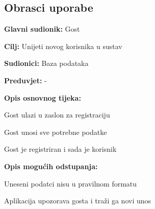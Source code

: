 			\eject 
			
			
				
			\subsection{Obrasci uporabe}
					

					\noindent {}
					\begin{packed_item}
	
						\item \textbf{Glavni sudionik: }Gost
						\item  \textbf{Cilj: }Unijeti novog korisnika u sustav
						\item  \textbf{Sudionici: }Baza podataka
						\item  \textbf{Preduvjet: }-
						\item  \textbf{Opis osnovnog tijeka: }
						
						\item[] \begin{packed_enum}
							\item Gost ulazi u zaslon za registraciju
							\item Gost unosi sve potrebne podatke
							\item Gost je registriran i sada je korisnik
						\end{packed_enum}
						
						\item  \textbf{Opis mogućih odstupanja:}
						
						\item[] \begin{packed_item}
	
							\item[2.a] Uneseni podatci nisu u pravilnom formatu
							\item[] \begin{packed_enum}
								\item Aplikacija upozorava gosta i traži ga novi unos
							\end{packed_enum}
						\end{packed_item}
					\end{packed_item}
					
